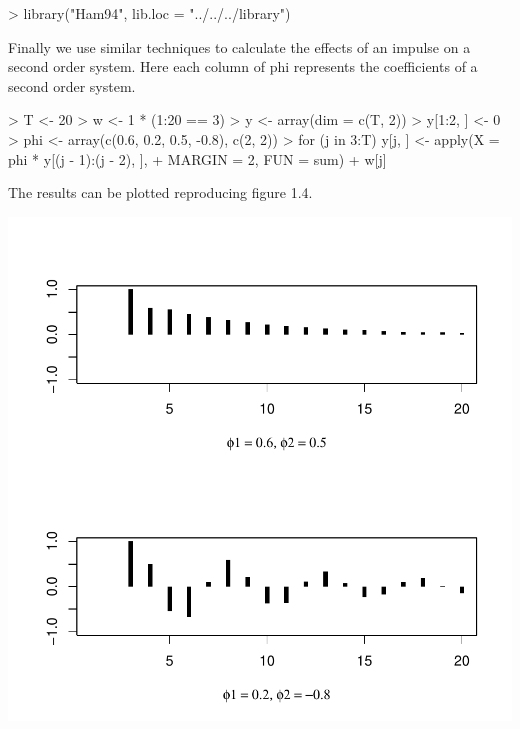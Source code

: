 \begin{Schunk}
\begin{Sinput}
> library("Ham94", lib.loc = "../../../library")
\end{Sinput}
\end{Schunk}
Finally we use similar techniques to calculate the effects of an impulse on a second order system.
Here each column of phi represents the coefficients of a second order system.
\begin{Schunk}
\begin{Sinput}
> T <- 20
> w <- 1 * (1:20 == 3)
> y <- array(dim = c(T, 2))
> y[1:2, ] <- 0
> phi <- array(c(0.6, 0.2, 0.5, -0.8), c(2, 2))
> for (j in 3:T) y[j, ] <- apply(X = phi * y[(j - 1):(j - 2), ], 
+     MARGIN = 2, FUN = sum) + w[j]
\end{Sinput}
\end{Schunk}
The results can be plotted reproducing figure 1.4.
\begin{center}
\includegraphics{p15-003}
\end{center}
